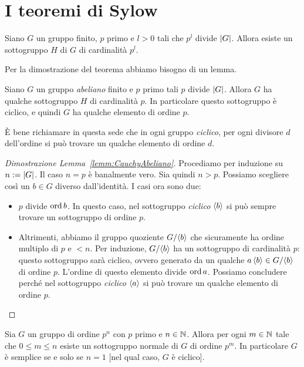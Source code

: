 
\section{I teoremi di Sylow}

\begin{teor}\label{teor:SylowI}
Siano $G$ un gruppo finito, $p$ primo e $l > 0$ tali che $p^l$ divide $\left\lvert G\right\rvert$. Allora esiste un sottogruppo $H$ di $G$ di cardinalità $p^l$.
\end{teor}

Per la dimostrazione del teorema abbiamo bisogno di un lemma.

\begin{lemm}\label{lemm:CauchyAbeliano}
Siano $G$ un gruppo {\em abeliano} finito e $p$ primo tali $p$ divide $\left\lvert G\right\rvert$. Allora $G$ ha qualche sottogruppo $H$ di cardinalità $p$. In particolare questo sottogruppo è ciclico, e quindi $G$ ha qualche elemento di ordine $p$.
\end{lemm}

È bene richiamare in questa sede che in ogni gruppo {\em ciclico}, per ogni divisore $d$ dell'ordine si può trovare un qualche elemento di ordine $d$. 

\begin{proof}[Dimostrazione Lemma~\ref{lemm:CauchyAbeliano}]
Procediamo per induzione su $n := \left\lvert G\right\rvert$. Il caso $n=p$ è banalmente vero. Sia quindi $n>p$. Possiamo scegliere così un $b \in G$ diverso dall'identità. I casi ora sono due:
\begin{itemize}
\item $p$ divide $\operatorname{ord} b$. In questo caso, nel sottogruppo {\em ciclico} $\left\langle b\right\rangle$ si può sempre trovare un sottogruppo di ordine $p$.
\item Altrimenti, abbiamo il gruppo quoziente ${G}{/}{\left\langle b\right\rangle}$ che sicuramente ha ordine multiplo di $p$ e $< n$. Per induzione, ${G}{/}{\left\langle b\right\rangle}$ ha un sottogruppo di cardinalità $p$: questo sottogruppo sarà ciclico, ovvero generato da un qualche $a \left\langle b\right\rangle \in {G}{/}{\left\langle b\right\rangle}$ di ordine $p$. L'ordine di questo elemento divide $\operatorname{ord} a$. Possiamo concludere perché nel sottogruppo {\em ciclico} $\left\langle a\right\rangle$ si può trovare un qualche elemento di ordine $p$. \qedhere
\end{itemize}
\end{proof}

\begin{prop}
Sia $G$ un gruppo di ordine $p^n$ con $p$ primo e $n \in \mathbb{N}$. Allora per ogni $m \in \mathbb{N}$ tale che $0 \le m \le n$ esiste un sottogruppo normale di $G$ di ordine $p^m$. In particolare $G$ è semplice se e solo se $n=1$ [nel qual caso, $G$ è ciclico].
\end{prop}

